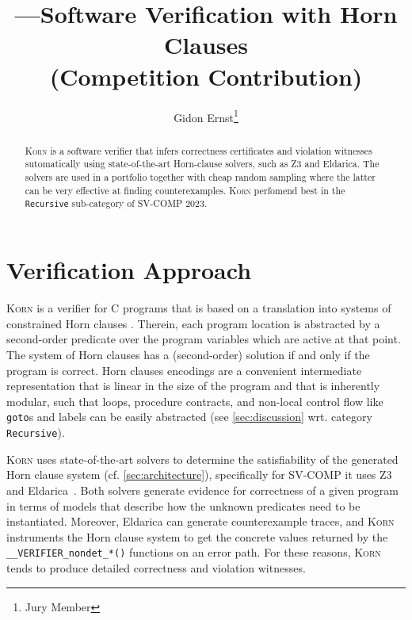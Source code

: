 \documentclass{llncs}
\author{Gidon Ernst\thanks{Jury Member}}
\title{\Korn---Software Verification with Horn Clauses \\ (Competition Contribution)}
\institute{LMU Munich \\ \mailto{gidon.ernst@lmu.de}}
\newcommand{\Korn}{\textsc{Korn}\xspace}
\begin{document}
\maketitle

\begin{abstract}
    \Korn is a software verifier that infers correctness certificates
    and violation witnesses
    sutomatically using state-of-the-art Horn-clause solvers, such as Z3 and Eldarica.
    The solvers are used in a portfolio together with cheap random sampling
    where the latter can be very effective at finding counterexamples.
    \Korn perfomend best in the \texttt{Recursive} sub-category of SV-COMP 2023.

\end{abstract}

\section{Verification Approach}
\label{sec:approach}

\Korn is a verifier for C programs that is based on a translation into systems of constrained Horn clauses
\cite{bjorner2015horn,gurfinkel2019science}.
Therein, each program location is abstracted by a second-order predicate
over the program variables which are active at that point.
The system of Horn clauses has a (second-order) solution if and only if the program is correct.
Horn clauses encodings are a convenient intermediate representation
that is linear in the size of the program
and that is inherently modular,
such that loops, procedure contracts, and non-local control flow like \texttt{goto}s and labels can be easily abstracted (see \cref{sec:discussion} wrt. category \texttt{Recursive}).

\Korn uses state-of-the-art solvers to determine the satisfiability of the generated Horn clause system (cf. \cref{sec:architecture}),
specifically for SV-COMP it uses Z3~\cite{bjorner2013solving} and Eldarica~\cite{hojjat2018eldarica}.
Both solvers generate evidence for correctness of a given program in terms of models that describe how the unknown predicates need to be instantiated.
Moreover, Eldarica can generate counterexample traces, and \Korn instruments the Horn clause system to get
the concrete values returned by the \texttt{\_\_VERIFIER\_nondet\_*()} functions on an error path.
For these reasons, \Korn tends to produce detailed correctness and violation witnesses.
\end{document}
